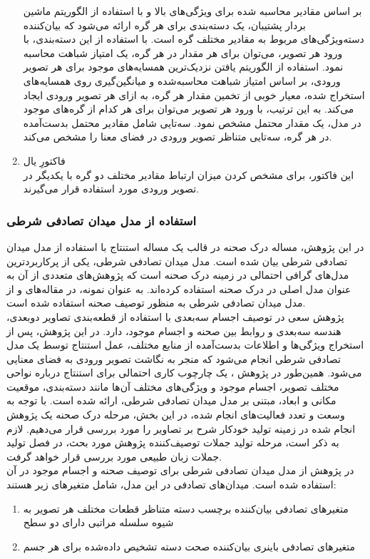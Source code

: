 \begin{enumerate}
بر اساس مقادیر محاسبه شده برای ویژگی‌های بالا و با استفاده از الگوریتم ماشین بردار پشتیبان، یک دسته‌بندی برای هر گره ارائه می‌شود که بیان‌کننده دسته‌ویژگی‌های مربوط به مقادیر مختلف گره است. با استفاده از این دسته‌بندی، با ورود هر تصویر، می‌توان برای هر مقدار در هر گره، یک امتیاز شباهت محاسبه نمود. استفاده از الگوریتم یافتن نزدیک‌ترین همسایه‌های موجود برای هر تصویر ورودی، بر اساس امتیاز شباهت محاسبه‌شده و میانگین‌گیری روی همسایه‌های استخراج شده، معیار خوبی از تخمین مقدار هر گره، به ازای هر تصویر ورودی ایجاد می‌کند. به این ترتیب، با ورود هر تصویر می‌توان برای هر کدام از گره‌های موجود در مدل، یک مقدار محتمل مشخص نمود. سه‌تایی شامل مقادیر محتمل بدست‌آمده در هر گره، سه‌تایی متناظر تصویر ورودی در فضای معنا را مشخص می‌کند.
\item فاکتورِ یال\\
این فاکتور، برای مشخص کردن میزان ارتباط مقادیر مختلف دو گره با یکدیگر در تصویر ورودی مورد استفاده قرار می‌گیرند.
\end{enumerate}

\subsubsection[استفاده از مدل میدان تصادفی شرطی]{استفاده از مدل میدان تصادفی شرطی}
در این پژوهش، مساله درک صحنه در قالب یک مساله استنتاج با استفاده از مدل میدان تصادفی شرطی بیان شده است. مدل میدان تصادفی شرطی، یکی از پرکاربردترین مدل‌های گرافی احتمالی در زمینه درک صحنه است که پژوهش‌های متعددی از آن به عنوان مدل اصلی در درک صحنه استفاده کرده‌اند. به عنوان نمونه، در مقاله‌های 
\cite{Lin_2013_ICCV}
و
\cite{ladicky2010and}
از مدل میدان تصادفی شرطی به منظور توصیف صحنه استفاده شده است.\\

 پژوهش \cite{Lin_2013_ICCV} سعی در توصیف اجسام سه‌بعدی با استفاده از قطعه‌بندی تصاویر دوبعدی، هندسه سه‌بعدی و روابط بین صحنه و اجسام موجود، دارد. در این پژوهش، پس از استخراج ویژگی‌ها و اطلاعات بدست‌آمده از منابع مختلف، عمل استنتاج توسط یک مدل تصادفی شرطی انجام می‌شود که منجر به نگاشت تصویر ورودی به فضای معنایی می‌شود. همین‌طور در پژوهش \cite{ladicky2010and}، یک چارچوب کاری احتمالی برای استنتاج درباره نواحی مختلف تصویر، اجسام موجود و ویژگی‌های مختلف آن‌ها مانند دسته‌بندی، موقعیت مکانی و ابعاد، مبتنی بر مدل میدان تصادفی شرطی، ارائه شده است. با توجه به وسعت و تعدد فعالیت‌های انجام شده، در این بخش، مرحله درک صحنه یک پژوهش انجام شده در زمینه تولید خودکار شرح بر تصاویر را مورد بررسی قرار می‌دهیم. لازم به ذکر است، مرحله تولید جملات توصیف‌کننده پژوهش مورد بحث، در فصل تولید جملات زبان طبیعی مورد بررسی قرار خواهد گرفت.
\\
در پژوهش\cite{fidler2013sentence}
از مدل میدان تصادفی شرطی برای توصیف صحنه و اجسام موجود در آن استفاده شده است. میدان‌های تصادفی در این مدل، شامل متغیرهای زیر هستند:
\begin{enumerate}
\item  متغیرهای تصادفی بیان‌کننده برچسب دسته متناظر قطعات مختلف هر تصویر به شیوه سلسله مراتبی دارای دو سطح
\item متغیرهای تصادفی باینری بیان‌کننده صحت دسته‌ تشخیص داده‌شده برای هر جسم
\end{enumerate}

